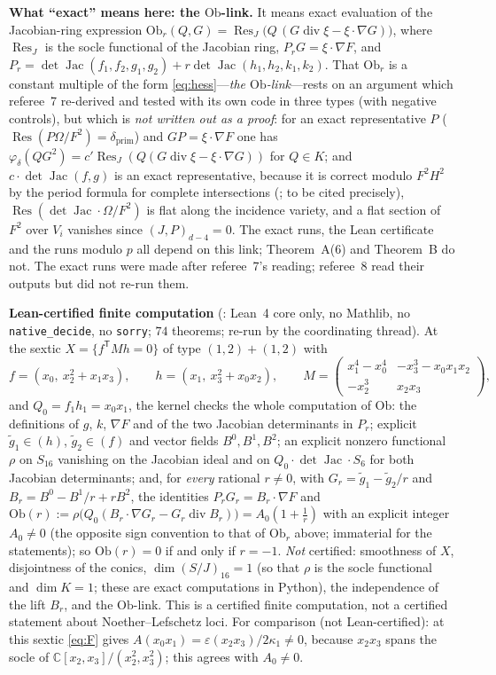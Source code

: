 \documentclass[11pt]{article}
\numberwithin{equation}{section}
\theoremstyle{remark}
\newcommand{\CC}{\mathbb{C}}
\newcommand{\Res}{\operatorname{Res}}
\newcommand{\Ob}{\mathrm{Ob}}
\newcommand{\gt}{\tilde g}
\newcommand{\run}[1]{\medskip\noindent\textbf{#1}}
\begin{document}
\run{What ``exact'' means here: the $\Ob$-link.} It means exact evaluation of the Jacobian-ring expression
$\Ob_r(Q,G)=\Res_J\bigl(Q\,(G\operatorname{div}\xi-\xi\cdot\nabla G)\bigr)$, where $\Res_J$ is the socle
functional of the Jacobian ring, $P_rG=\xi\cdot\nabla F$, and
$P_r=\det\operatorname{Jac}(f_1,f_2,g_1,g_2)+r\det\operatorname{Jac}(h_1,h_2,k_1,k_2)$. That $\Ob_r$ is a constant
multiple of the form \eqref{eq:hess}---\emph{the $\Ob$-link}---rests on an argument which referee~7 re-derived
and tested with its own code in three types (with negative controls), but which is \emph{not written out as a
proof}: for an exact representative $P$ ($\Res(P\Omega/F^2)=\delta_{\mathrm{prim}}$) and $GP=\xi\cdot\nabla F$
one has $\varphi_\delta(QG^2)=c'\Res_J(Q(G\operatorname{div}\xi-\xi\cdot\nabla G))$ for $Q\in K$; and
$c\cdot\det\operatorname{Jac}(f,g)$ is an exact representative, because it is correct modulo $F^2H^2$ by the
period formula for complete intersections (\cite{CG,VL}; to be cited precisely),
$\Res(\det\operatorname{Jac}\cdot\Omega/F^2)$ is flat along the incidence variety, and a flat section of $F^2$
over $V_i$ vanishes since $(J,P)_{d-4}=0$. The exact runs, the Lean certificate and the runs modulo $p$ all
depend on this link; Theorem~A(6) and Theorem~B do not. The exact runs were made after referee~7's reading;
referee~8 read their outputs but did not re-run them.

\run{Lean-certified finite computation} (: Lean~4 core only, no Mathlib, no
\texttt{native\_decide}, no \texttt{sorry}; $74$ theorems; re-run by the coordinating thread). At the sextic
$X=\{f^{\mathsf T}Mh=0\}$ of type $(1,2)+(1,2)$ with
\[
f=(x_0,\ x_2^2+x_1x_3),\qquad h=(x_1,\ x_3^2+x_0x_2),\qquad
M=\begin{pmatrix}x_1^4-x_0^4&-x_3^3-x_0x_1x_2\\-x_2^3&x_2x_3\end{pmatrix},
\]
and $Q_0=f_1h_1=x_0x_1$, the kernel checks the whole computation of $\Ob$: the definitions of $g$, $k$,
$\nabla F$ and of the two Jacobian determinants in $P_r$; explicit $\gt_1\in(h)$, $\gt_2\in(f)$ and vector fields
$B^0,B^1,B^2$; an explicit nonzero functional $\rho$ on $S_{16}$ vanishing on the Jacobian ideal and on
$Q_0\cdot\det\operatorname{Jac}\cdot S_6$ for both Jacobian determinants; and, for \emph{every} rational
$r\neq0$, with $G_r=\gt_1-\gt_2/r$ and $B_r=B^0-B^1/r+rB^2$, the identities $P_rG_r=B_r\cdot\nabla F$ and
$\Ob(r):=\rho\bigl(Q_0(B_r\cdot\nabla G_r-G_r\operatorname{div}B_r)\bigr)=A_0(1+\frac1r)$ with an explicit integer
$A_0\neq0$ (the opposite sign convention to that of $\Ob_r$ above; immaterial for the statements); so $\Ob(r)=0$ if and only if $r=-1$. \emph{Not} certified: smoothness of $X$, disjointness of the
conics, $\dim(S/J)_{16}=1$ (so that $\rho$ is the socle functional and $\dim K=1$; these are exact computations
in Python), the independence of the lift $B_r$, and the $\Ob$-link. This is a certified finite computation, not
a certified statement about Noether--Lefschetz loci. For comparison (not Lean-certified): at this sextic
\eqref{eq:F} gives $A(x_0x_1)=\varepsilon(x_2x_3)/2\kappa_1\neq0$, because $x_2x_3$ spans the socle of
$\CC[x_2,x_3]/(x_2^2,x_3^2)$; this agrees with $A_0\neq0$.
\end{document}
